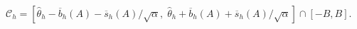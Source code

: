 \(\mathcal C_h=[\widehat\theta_h-\overline b_h(A)-\overline s_h(A)/\sqrt\alpha,\;\widehat\theta_h+\overline b_h(A)+\overline s_h(A)/\sqrt\alpha]\cap[-B,B]\).